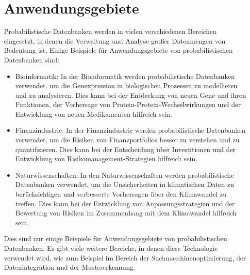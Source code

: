 \chapter{Anwendungsgebiete}

Probabilistische Datenbanken werden in vielen verschiedenen Bereichen eingesetzt, in denen die Verwaltung und Analyse großer Datenmengen von Bedeutung ist. Einige Beispiele für Anwendungsgebiete von probabilistischen Datenbanken sind:

\begin{itemize}
	\item Bioinformatik: In der Bioinformatik werden probabilistische Datenbanken verwendet, um die Genexpression in biologischen Prozessen zu modellieren und zu analysieren. Dies kann bei der Entdeckung von neuen Gene und ihren Funktionen, der Vorhersage von Protein-Protein-Wechselwirkungen und der Entwicklung von neuen Medikamenten hilfreich sein.
	
	\item  Finanzindustrie: In der Finanzindustrie werden probabilistische Datenbanken verwendet, um die Risiken von Finanzportfolios besser zu verstehen und zu quantifizieren. Dies kann bei der Entscheidung über Investitionen und der Entwicklung von Risikomanagement-Strategien hilfreich sein.
	
	\item Naturwissenschaften: In den Naturwissenschaften werden probabilistische Datenbanken verwendet, um die Unsicherheiten in klimatischen Daten zu berücksichtigen und verbesserte Vorhersagen über den Klimawandel zu treffen. Dies kann bei der Entwicklung von Anpassungsstrategien und der Bewertung von Risiken im Zusammenhang mit dem Klimawandel hilfreich sein.
\end{itemize}

Dies sind nur einige Beispiele für Anwendungsgebiete von probabilistischen Datenbanken. Es gibt viele weitere Bereiche, in denen diese Technologie verwendet wird, wie zum Beispiel im Bereich der Suchmaschinenoptimierung, der Datenintegration und der Mustererkennung.



